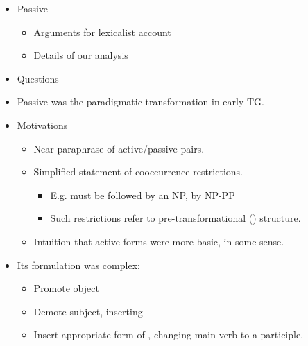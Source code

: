 \documentclass[a4paper,landscape,headrule,footrule]{foils}
\begin{document}
\maketitle





\begin{itemize}
\item Passive
  \begin{itemize}
  \item Arguments for lexicalist account
  \item Details of our analysis
  \end{itemize}
\item Questions
\end{itemize}


\begin{itemize}
\item Passive was the paradigmatic transformation in early TG.
\item Motivations
  \begin{itemize}
  \item Near paraphrase of active/passive pairs.
  \item Simplified statement of cooccurrence restrictions.
    \begin{itemize}
    \item E.g.  must be followed by an NP,  by NP-PP
    \item Such restrictions refer to pre-transformational () structure.
    \end{itemize}
  \item Intuition that active forms were more basic, in some sense. 
  \end{itemize}
\item Its formulation was complex:  
  \begin{itemize}
  \item Promote object
  \item Demote subject, inserting 
  \item Insert appropriate form of , changing main verb to a participle.
  \end{itemize}
\end{itemize}

\end{document}
